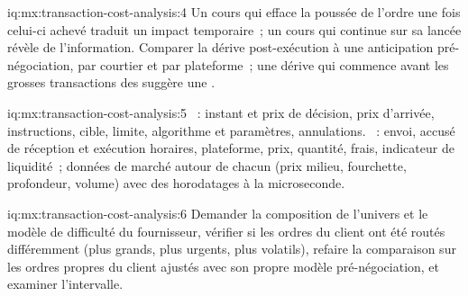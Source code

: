 \begin{solution}{iq:mx:transaction-cost-analysis:4}
Un cours qui efface la poussée de l'ordre une fois celui-ci achevé traduit un impact temporaire~; un cours qui continue sur sa lancée révèle de l'information. Comparer la dérive post-exécution
à une anticipation pré-négociation, par courtier et par plateforme~; une dérive qui commence avant les grosses transactions des  suggère une .
\end{solution}

\begin{solution}{iq:mx:transaction-cost-analysis:5}
~: instant et prix de décision, prix d'arrivée, instructions, cible, limite, algorithme et paramètres, annulations. ~: envoi, accusé de réception et exécution
horaires, plateforme, prix, quantité, frais, indicateur de liquidité~; données de marché autour de chacun (prix milieu, fourchette, profondeur, volume) avec des horodatages à la microseconde.
\end{solution}

\begin{solution}{iq:mx:transaction-cost-analysis:6}
Demander la composition de l'univers et le modèle de difficulté du fournisseur, vérifier si les ordres du client ont été routés différemment (plus grands, plus urgents,
plus volatils), refaire la comparaison sur les ordres propres du client ajustés avec son propre modèle pré-négociation, et examiner l'intervalle.
\end{solution}
